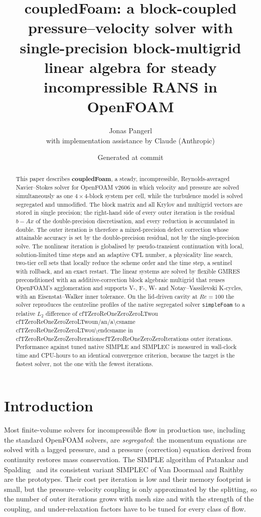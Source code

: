 \documentclass[11pt,a4paper]{article}
\title{\textbf{coupledFoam}: a block-coupled pressure--velocity solver with
  single-precision block-multigrid linear algebra for steady incompressible
  RANS in OpenFOAM}
\author{Jonas Pangerl\\[0.5ex]
  {\small with implementation assistance by Claude (Anthropic)}}
\date{Generated at commit \texttt{\cfnum{Commit}}\cftitlenote}
\makeatletter
\newcommand{\cfpendingmark}{\fbox{\scriptsize pending}}
\newcommand{\cfnum}[1]{%
  \ifcsname cf#1\endcsname\csname cf#1\endcsname\else\cfpendingmark\fi}
\def\cf@na{n/a}
\newcommand{\cfsci}[1]{%
  \ifcsname cf#1\endcsname
    \edef\cf@tmp{\csname cf#1\endcsname}%
    \ifx\cf@tmp\cf@na n/a\else\expandafter\num\expandafter{\cf@tmp}\fi
  \else\cfpendingmark\fi}
\newcounter{algorithm}
\newcommand{\code}[1]{\texttt{#1}}
\makeatother
\begin{document}
\maketitle

\begin{abstract}
This paper describes \textbf{coupledFoam}, a steady, incompressible, Reynolds-averaged
Navier--Stokes solver for OpenFOAM v2606 in which velocity and pressure are
solved simultaneously as one $4\times4$-block system per cell, while the
turbulence model is solved segregated and unmodified. The block matrix and
all Krylov and multigrid vectors are stored in single precision; the
right-hand side of every outer iteration is the residual $b-Ax$ of the
double-precision discretisation, and every reduction is accumulated in
double. The outer iteration is therefore a mixed-precision defect
correction whose attainable accuracy is set by the double-precision
residual, not by the single-precision solve. The nonlinear iteration is
globalised by pseudo-transient continuation with local, solution-limited
time steps and an adaptive CFL number, a physicality line search, two-tier
cell sets that locally reduce the scheme order and the time step,
a sentinel with rollback, and an exact restart. The linear systems are
solved by flexible GMRES preconditioned with an additive-correction block
algebraic multigrid that reuses OpenFOAM's agglomeration and supports V-, F-,
W- and Notay--Vassilevski K-cycles, with an Eisenstat--Walker inner
tolerance. On the lid-driven cavity at $Re=100$ the solver reproduces the
centreline profiles of the native segregated solver \code{simpleFoam} to a
relative $L_2$ difference of \cfsci{TZeroReOneZeroZeroLTwou} in
\cfnum{TZeroReOneZeroZeroIterations} outer iterations. Performance against
tuned native SIMPLE and SIMPLEC is measured in wall-clock time and CPU-hours
to an identical convergence criterion, because the target is the fastest
solver, not the one with the fewest iterations.
\end{abstract}

\tableofcontents

\section{Introduction}\label{sec:intro}

Most finite-volume solvers for incompressible flow in production use,
including the standard OpenFOAM solvers, are \emph{segregated}: the momentum
equations are solved with a lagged pressure, and a pressure (correction)
equation derived from continuity restores mass conservation. The SIMPLE
algorithm of Patankar and Spalding~\cite{Patankar1972} and its consistent
variant SIMPLEC of Van Doormaal and Raithby~\cite{VanDoormaal1984} are the
prototypes. Their cost per iteration is low and their memory footprint is
small, but the pressure--velocity coupling is only approximated by the
splitting, so the number of outer iterations grows with mesh size and with
the strength of the coupling, and under-relaxation factors have to be
tuned for every class of flow.
\end{document}
